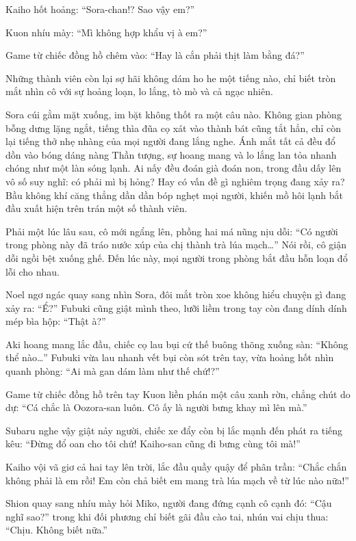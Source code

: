 \documentclass[../main.tex]{subfiles}
\begin{document}
Kaiho hốt hoảng: ``Sora-chan!? Sao vậy em?''

Kuon nhíu mày: ``Mì không hợp khẩu vị à em?''

Game từ chiếc đồng hồ chêm vào: ``Hay là cắn phải thịt làm bằng đá?''

Những thành viên còn lại sợ hãi không dám ho he một tiếng nào, chỉ biết tròn mắt nhìn cô với sự hoảng loạn, lo lắng, tò mò và cả ngạc nhiên.

Sora cúi gằm mặt xuống, im bặt không thốt ra một câu nào. Không gian phòng bỗng dưng lặng ngắt, tiếng thìa đũa cọ xát vào thành bát cũng tắt hẳn, chỉ còn lại tiếng thở nhẹ nhàng của mọi người đang lắng nghe. Ánh mắt tất cả đều đổ dồn vào bóng dáng nàng Thần tượng, sự hoang mang và lo lắng lan tỏa nhanh chóng như một làn sóng lạnh. Ai nấy đều đoán già đoán non, trong đầu dấy lên vô số suy nghĩ: có phải mì bị hỏng? Hay có vấn đề gì nghiêm trọng đang xảy ra? Bầu không khí căng thẳng dần dần bóp nghẹt mọi người, khiến mồ hôi lạnh bắt đầu xuất hiện trên trán một số thành viên.

Phải một lúc lâu sau, cô mới ngẩng lên, phồng hai má nũng nịu dỗi: ``Có người trong phòng này đã tráo nước xúp của chị thành trà lúa mạch\dots'' Nói rồi, cô giận dỗi ngồi bệt xuống ghế.
Đến lúc này, mọi người trong phòng bắt đầu hỗn loạn đổ lỗi cho nhau.

Noel ngơ ngác quay sang nhìn Sora, đôi mắt tròn xoe không hiểu chuyện gì đang xảy ra: ``Ể?''
Fubuki cũng giật mình theo, lưỡi liềm trong tay còn đang dính dính mép bìa hộp: ``Thật à?''

Aki hoang mang lắc đầu, chiếc cọ lau bụi cứ thế buông thõng xuống sàn: ``Không thể nào\dots''
Fubuki vừa lau nhanh vết bụi còn sót trên tay, vừa hoảng hốt nhìn quanh phòng: ``Ai mà gan dám làm như thế chứ!?''

Game từ chiếc đồng hồ trên tay Kuon liền phán một câu xanh rờn, chẳng chút do dự: ``Cá chắc là Oozora-san luôn. Cô ấy là người bưng khay mì lên mà.''

Subaru nghe vậy giật nảy người, chiếc xe đẩy còn bị lắc mạnh đến phát ra tiếng kêu: ``Đừng đổ oan cho tôi chứ! Kaiho-san cũng đi bưng cùng tôi mà!''

Kaiho vội vã giơ cả hai tay lên trời, lắc đầu quầy quậy để phân trần: ``Chắc chắn không phải là em rồi! Em còn chả biết em mang trà lúa mạch về từ lúc nào nữa!''

Shion quay sang nhíu mày hỏi Miko, người đang đứng cạnh cô cạnh đó: ``Cậu nghĩ sao?'' trong khi đối phương chỉ biết gãi đầu cào tai, nhún vai chịu thua: ``Chịu. Không biết nữa.''
\end{document}
